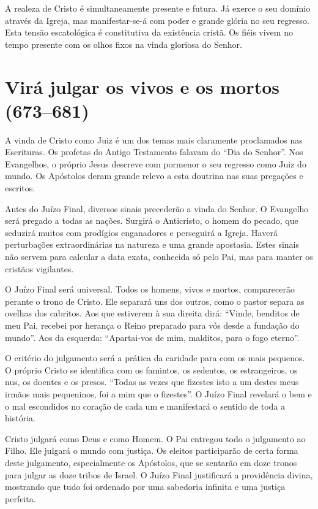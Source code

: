 A realeza de Cristo é simultaneamente presente e futura. Já exerce o seu domínio através da Igreja, mas manifestar-se-á com poder e grande glória no seu regresso. Esta tensão escatológica é constitutiva da existência cristã. Os fiéis vivem no tempo presente com os olhos fixos na vinda gloriosa do Senhor.

\section{Virá julgar os vivos e os mortos (673--681)}

A vinda de Cristo como Juiz é um dos temas mais claramente proclamados nas Escrituras. Os profetas do Antigo Testamento falavam do ``Dia do Senhor''. Nos Evangelhos, o próprio Jesus descreve com pormenor o seu regresso como Juiz do mundo. Os Apóstolos deram grande relevo a esta doutrina nas suas pregações e escritos.

Antes do Juízo Final, diversos sinais precederão a vinda do Senhor. O Evangelho será pregado a todas as nações. Surgirá o Anticristo, o homem do pecado, que seduzirá muitos com prodígios enganadores e perseguirá a Igreja. Haverá perturbações extraordinárias na natureza e uma grande apostasia. Estes sinais não servem para calcular a data exata, conhecida só pelo Pai, mas para manter os cristãos vigilantes.

O Juízo Final será universal. Todos os homens, vivos e mortos, comparecerão perante o trono de Cristo. Ele separará uns dos outros, como o pastor separa as ovelhas dos cabritos. Aos que estiverem à sua direita dirá: ``Vinde, benditos de meu Pai, recebei por herança o Reino preparado para vós desde a fundação do mundo''. Aos da esquerda: ``Apartai-vos de mim, malditos, para o fogo eterno''.

O critério do julgamento será a prática da caridade para com os mais pequenos. O próprio Cristo se identifica com os famintos, os sedentos, os estrangeiros, os nus, os doentes e os presos. ``Todas as vezes que fizestes isto a um destes meus irmãos mais pequeninos, foi a mim que o fizestes''. O Juízo Final revelará o bem e o mal escondidos no coração de cada um e manifestará o sentido de toda a história.

Cristo julgará como Deus e como Homem. O Pai entregou todo o julgamento ao Filho. Ele julgará o mundo com justiça. Os eleitos participarão de certa forma deste julgamento, especialmente os Apóstolos, que se sentarão em doze tronos para julgar as doze tribos de Israel. O Juízo Final justificará a providência divina, mostrando que tudo foi ordenado por uma sabedoria infinita e uma justiça perfeita.

